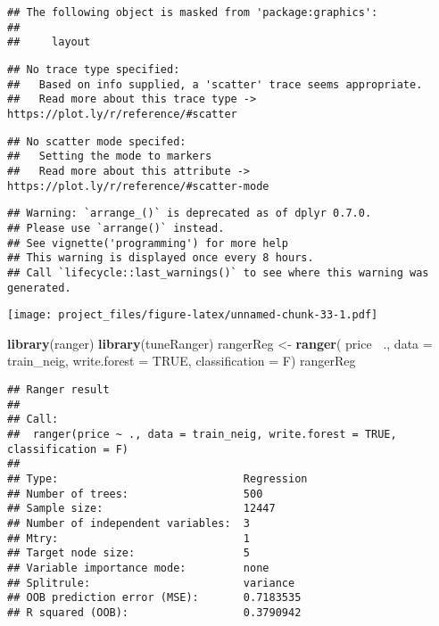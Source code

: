\documentclass[
]{article}
\newenvironment{Shaded}{\begin{snugshade}}{\end{snugshade}}
\newcommand{\DataTypeTok}[1]{\textcolor[rgb]{0.13,0.29,0.53}{#1}}
\newcommand{\KeywordTok}[1]{\textcolor[rgb]{0.13,0.29,0.53}{\textbf{#1}}}
\newcommand{\NormalTok}[1]{#1}
\newcommand{\OperatorTok}[1]{\textcolor[rgb]{0.81,0.36,0.00}{\textbf{#1}}}
\newcommand{\OtherTok}[1]{\textcolor[rgb]{0.56,0.35,0.01}{#1}}
\newcommand{\StringTok}[1]{\textcolor[rgb]{0.31,0.60,0.02}{#1}}
\begin{document}
\begin{verbatim}
## The following object is masked from 'package:graphics':
## 
##     layout
\end{verbatim}

\begin{Shaded}
\end{Shaded}

\begin{verbatim}
## No trace type specified:
##   Based on info supplied, a 'scatter' trace seems appropriate.
##   Read more about this trace type -> https://plot.ly/r/reference/#scatter
\end{verbatim}

\begin{verbatim}
## No scatter mode specifed:
##   Setting the mode to markers
##   Read more about this attribute -> https://plot.ly/r/reference/#scatter-mode
\end{verbatim}

\begin{verbatim}
## Warning: `arrange_()` is deprecated as of dplyr 0.7.0.
## Please use `arrange()` instead.
## See vignette('programming') for more help
## This warning is displayed once every 8 hours.
## Call `lifecycle::last_warnings()` to see where this warning was generated.
\end{verbatim}

\texttt{[image: project\_files/figure-latex/unnamed-chunk-33-1.pdf]}

\begin{Shaded}
\begin{Highlighting}[]
\KeywordTok{library}\NormalTok{(ranger)}
\KeywordTok{library}\NormalTok{(tuneRanger)}
\NormalTok{rangerReg <-}\StringTok{ }\KeywordTok{ranger}\NormalTok{( price}\OperatorTok{~}\StringTok{ }\NormalTok{., }\DataTypeTok{data =}\NormalTok{ train_neig, }\DataTypeTok{write.forest =} \OtherTok{TRUE}\NormalTok{, }\DataTypeTok{classification =}\NormalTok{ F)}
\NormalTok{rangerReg}
\end{Highlighting}
\end{Shaded}

\begin{verbatim}
## Ranger result
## 
## Call:
##  ranger(price ~ ., data = train_neig, write.forest = TRUE, classification = F) 
## 
## Type:                             Regression 
## Number of trees:                  500 
## Sample size:                      12447 
## Number of independent variables:  3 
## Mtry:                             1 
## Target node size:                 5 
## Variable importance mode:         none 
## Splitrule:                        variance 
## OOB prediction error (MSE):       0.7183535 
## R squared (OOB):                  0.3790942
\end{verbatim}
\end{document}
